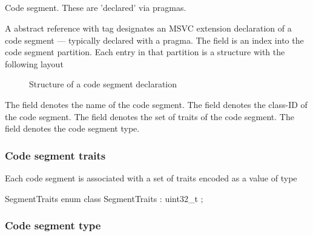 


\subsection{}
\label{sec:ifc:DeclSort:OutputSegment}

 Code segment. These are 'declared' via pragmas.

 A  abstract reference with tag 
 designates an MSVC extension declaration of a code segment --- typically declared with a pragma.
 The  field is an index into the code segment partition.  Each entry
 in that partition is a structure with the following layout
 \begin{figure}[H]
	\centering
	\caption{Structure of a code segment declaration}
	\label{fig:ifc-code-segment-structure}
 \end{figure}

 The  field denotes the name of the code segment.
 The  field denotes the class-ID of the code segment.
 The  field denotes the set of traits of the code segment.
 The  field denotes the code segment type.

\subsubsection{Code segment traits}
\label{sec:ifc-code-segment-traits}

Each code segment is associated with a set of traits encoded as a value
of type
%
\begin{typedef}{SegmentTraits}{}
	enum class SegmentTraits : uint32_t { };
\end{typedef}
%

\subsubsection{Code segment type}
\label{sec:ifc-code-segment-type}

